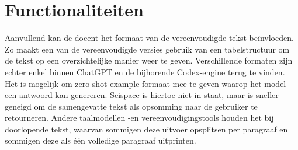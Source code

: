 \begin{table}[H]
	\centering
\end{table}

\section{Functionaliteiten}

Aanvullend kan de docent het formaat van de vereenvoudigde tekst beïnvloeden. Zo maakt een van de vereenvoudigde versies gebruik van een tabelstructuur om de tekst op een overzichtelijke manier weer te geven. Verschillende formaten zijn echter enkel binnen ChatGPT en de bijhorende Codex-engine terug te vinden. Het is mogelijk om zero-shot example formaat mee te geven waarop het model een antwoord kan genereren. Scispace is hiertoe niet in staat, maar is sneller geneigd om de samengevatte tekst als opsomming naar de gebruiker te retourneren. Andere taalmodellen -en vereenvoudigingstools houden het bij doorlopende tekst, waarvan sommigen deze uitvoer opsplitsen per paragraaf en sommigen deze als één volledige paragraaf uitprinten.

